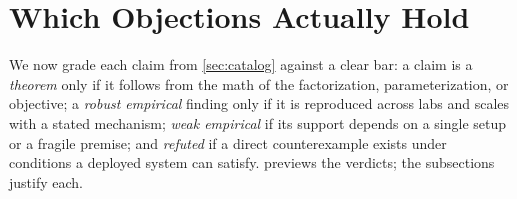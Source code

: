 
\section{Which Objections Actually Hold}
\label{sec:what_holds}

We now grade each claim from \cref{sec:catalog} against a clear bar:
a claim is a \emph{theorem} only if it follows from the math of the factorization, parameterization, or objective;
a \emph{robust empirical} finding only if it is reproduced across labs and scales with a stated mechanism;
\emph{weak empirical} if its support depends on a single setup or a fragile premise;
and \emph{refuted} if a direct counterexample exists under conditions a deployed system can satisfy.
 previews the verdicts;
the subsections justify each.

